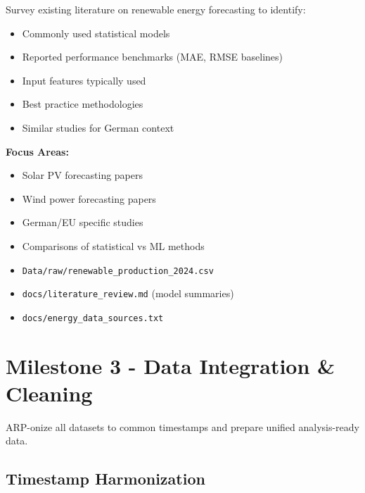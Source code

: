 \documentclass[11pt,a4paper]{article}
\begin{document}
Survey existing literature on renewable energy forecasting to identify:
\begin{itemize}
    \item Commonly used statistical models
    \item Reported performance benchmarks (MAE, RMSE baselines)
    \item Input features typically used
    \item Best practice methodologies
    \item Similar studies for German context
\end{itemize}

\textbf{Focus Areas:}
\begin{itemize}
    \item Solar PV forecasting papers
    \item Wind power forecasting papers
    \item German/EU specific studies
    \item Comparisons of statistical vs ML methods
\end{itemize}

\begin{deliverablebox}
\begin{itemize}
    \item \texttt{Data/raw/renewable\_production\_2024.csv}
    \item \texttt{docs/literature\_review.md} (model summaries)
    \item \texttt{docs/energy\_data\_sources.txt}
\end{itemize}
\end{deliverablebox}

\section{Milestone 3 - Data Integration \& Cleaning}

\begin{objectivebox}
ARP-onize all datasets to common timestamps and prepare unified analysis-ready data.
\end{objectivebox}

\subsection{Timestamp Harmonization}
\end{document}
